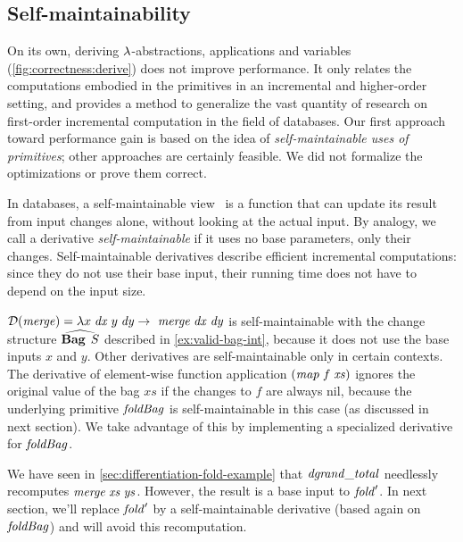 
\subsection{Self-maintainability}
\label{sec:performance-cons}
\label{ssec:self-maint}

\begin{oldSec}
On its own, deriving $\lambda$-abstractions, applications and
variables (\cref{fig:correctness:derive}) does not improve performance.
It only relates the computations embodied in the primitives in
an incremental and higher-order setting, and provides a method to
generalize the vast quantity of research on first-order incremental
computation in the field of databases.
Our first approach toward performance gain is based on the idea of \emph{self-maintainable uses of primitives};
other approaches are certainly feasible. We did not formalize the
optimizations or prove them correct.
\end{oldSec}

In databases, a self-maintainable view~\citep{Gupta99MMV} is a function that can
update its result from input changes alone, without looking at
the actual input. By analogy, we call a derivative
\emph{self-maintainable} if it uses no
base parameters, only their changes. Self-maintainable derivatives
describe efficient incremental computations: since they do not
use their base input, their running time does not have to depend on the input
size.

\begin{examples}
$\Derive{\MERGE} = \Lam {x\; \D x\; y \; \D y}{\Merge{\D x}{\D y}}$
is self-maintainable with the
change structure $\ChangeStruct{\Bag{S}}$ described in
\cref{ex:valid-bag-int}, because it does not use the base
inputs $x$ and $y$.
Other derivatives are self-maintainable only in certain contexts.
The derivative of element-wise function application
$\App*{\App\MAP f}{\mathit{xs}}$ ignores the original
value of the bag $\mathit{xs}$ if the changes to
%
$f$ are always nil, because the underlying primitive $\mathit{foldBag}$
is self-maintainable in this case (as discussed in next section).
%
We take advantage of this by implementing a specialized
derivative for $\mathit{foldBag}$.

We have seen in \cref{sec:differentiation-fold-example} that $\mathit{dgrand\_total}$
needlessly recomputes $\Merge\Xs\Ys$. However, the result is a
base input to $\mathit{fold}'$.
%
In next section, we'll replace $\mathit{fold}'$ by a self-maintainable
derivative (based again on $\mathit{foldBag}$) and will avoid this
recomputation.
\end{examples}

